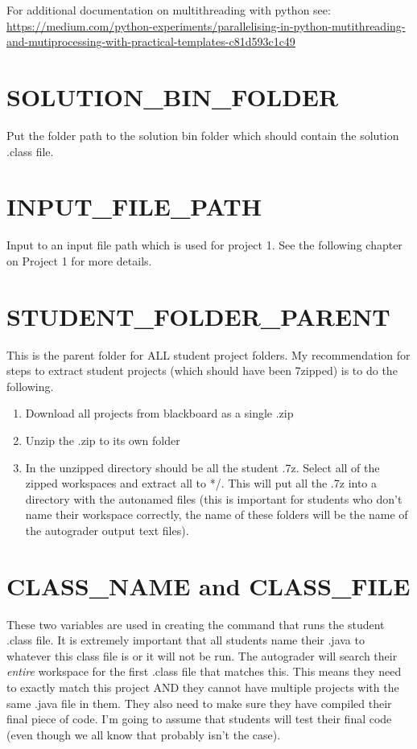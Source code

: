 \documentclass[10pt,a4paper]{book}
\begin{document}
For additional documentation on multithreading with python see:\\
\href{https://medium.com/python-experiments/parallelising-in-python-mutithreading-and-mutiprocessing-with-practical-templates-c81d593c1c49}{https://medium.com/python-experiments/parallelising-in-python-mutithreading-and-mutiprocessing-with-practical-templates-c81d593c1c49}

\section{SOLUTION\_BIN\_FOLDER}
Put the folder path to the solution bin folder which should contain the solution .class file.

\section{INPUT\_FILE\_PATH}
Input to an input file path which is used for project 1. See the following chapter on Project 1 for more details.

\section{STUDENT\_FOLDER\_PARENT}
This is the parent folder for ALL student project folders. My recommendation for steps to extract student projects (which should have been 7zipped) is to do the following.
\begin{enumerate}
\item Download all projects from blackboard as a single .zip
\item Unzip the .zip to its own folder
\item In the unzipped directory should be all the student .7z. Select all of the zipped workspaces and extract all to */. This will put all the .7z into a directory with the autonamed files (this is important for students who don't name their workspace correctly, the name of these folders will be the name of the autograder output text files).
\end{enumerate}

\section{CLASS\_NAME and CLASS\_FILE}
These two variables are used in creating the command that runs the student .class file. It is extremely important that all students name their .java to whatever this class file is or it will not be run. The autograder will search their \textit{entire} workspace for the first .class file that matches this. This means they need to exactly match this project AND they cannot have multiple projects with the same .java file in them. They also need to make sure they have compiled their final piece of code. I'm going to assume that students will test their final code (even though we all know that probably isn't the case).
\end{document}
